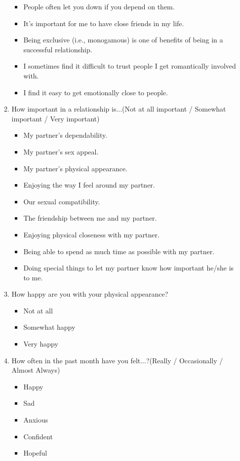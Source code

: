 \begin{appendices}
\begin{itemize}
\begin{enumerate}
\begin{itemize}
				\item People often let you down if you depend on them.
				\item It's important for me to have close friends in my life.
				\item Being exclusive (i.e., monogamous) is one of benefits of being in a successful relationship.
				\item I sometimes find it difficult to trust people I get romantically involved with.
				\item I find it easy to get emotionally close to people.		
			\end{itemize}
			\item How important in a relationship is...(Not at all important / Somewhat important / Very important)
			\begin{itemize}
				\item My partner's dependability.
				\item My partner's sex appeal.
				\item My partner's physical appearance.
				\item Enjoying the way I feel around my partner.
				\item Our sexual compatibility.
				\item The friendship between me and my partner.
				\item Enjoying physical closeness with my partner.
				\item Being able to spend as much time as possible with my partner.
				\item Doing special things to let my partner know how important he/she is to me.
			\end{itemize}
			\item How happy are you with your physical appearance?
			\begin{itemize}
				\item Not at all
				\item Somewhat happy
				\item Very happy
			\end{itemize}
			\item How often in the past month have you felt...?(Really / Occasionally / Almost Always)
			\begin{itemize}
				\item Happy
				\item Sad
				\item Anxious
				\item Confident
				\item Hopeful

\end{itemize}
\end{enumerate}
\end{itemize}
\end{appendices}
